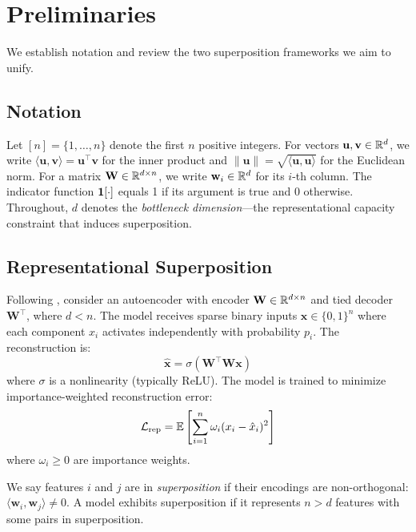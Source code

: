 \section{Preliminaries}
\label{sec:prelim}

We establish notation and review the two superposition frameworks we aim to unify.

\subsection{Notation}

Let $[n] = \{1, \ldots, n\}$ denote the first $n$ positive integers. For vectors $\mathbf{u}, \mathbf{v} \in \mathbb{R}^d$, we write $\langle \mathbf{u}, \mathbf{v} \rangle = \mathbf{u}^\top \mathbf{v}$ for the inner product and $\|\mathbf{u}\| = \sqrt{\langle \mathbf{u}, \mathbf{u} \rangle}$ for the Euclidean norm. For a matrix $\mathbf{W} \in \mathbb{R}^{d \times n}$, we write $\mathbf{w}_i \in \mathbb{R}^d$ for its $i$-th column. The indicator function $\mathbf{1}[\cdot]$ equals 1 if its argument is true and 0 otherwise. Throughout, $d$ denotes the \emph{bottleneck dimension}---the representational capacity constraint that induces superposition.

\subsection{Representational Superposition}
\label{sec:rep_superposition}

Following \citet{elhage2022toy}, consider an autoencoder with encoder $\mathbf{W} \in \mathbb{R}^{d \times n}$ and tied decoder $\mathbf{W}^\top$, where $d < n$. The model receives sparse binary inputs $\mathbf{x} \in \{0, 1\}^n$ where each component $x_i$ activates independently with probability $p_i$. The reconstruction is:
\begin{equation}
\hat{\mathbf{x}} = \sigma(\mathbf{W}^\top \mathbf{W} \mathbf{x})
\end{equation}
where $\sigma$ is a nonlinearity (typically ReLU). The model is trained to minimize importance-weighted reconstruction error:
\begin{equation}
\mathcal{L}_{\text{rep}} = \mathbb{E}\left[\sum_{i=1}^n \omega_i (x_i - \hat{x}_i)^2\right]
\label{eq:rep_loss}
\end{equation}
where $\omega_i \geq 0$ are importance weights.

\begin{definition}
\label{def:rep_super}
We say features $i$ and $j$ are in \emph{superposition} if their encodings are non-orthogonal: $\langle \mathbf{w}_i, \mathbf{w}_j \rangle \neq 0$. A model exhibits superposition if it represents $n > d$ features with some pairs in superposition.
\end{definition}

